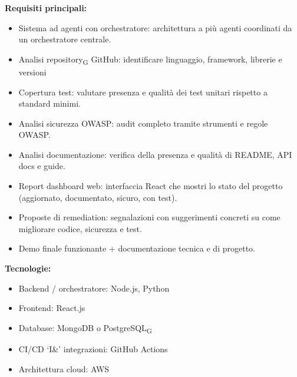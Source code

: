 \vspace{0.3cm}
\textbf{Requisiti principali:}
\begin{itemize}
	\item {Sistema ad agenti con orchestratore: architettura a più agenti coordinati da un orchestratore centrale.}
	\item {Analisi repository\textsubscript{G} GitHub: identificare linguaggio, framework, librerie e versioni}
    \item {Copertura test: valutare presenza e qualità dei test unitari rispetto a standard minimi.}
    \item {Analisi sicurezza OWASP: audit completo tramite strumenti e regole OWASP.}
    \item {Analisi documentazione: verifica della presenza e qualità di README, API docs e guide.}
    \item {Report dashboard web: interfaccia React che mostri lo stato del progetto (aggiornato, documentato, sicuro, con test).}
    \item {Proposte di remediation: segnalazioni con suggerimenti concreti su come migliorare codice, sicurezza e test.}
    \item {Demo finale funzionante + documentazione tecnica e di progetto.}
\end{itemize}

\vspace{0.3cm}
\textbf{Tecnologie:}
\begin{itemize}
	\item {Backend / orchestratore: Node.js, Python}
    \item {Frontend: React.js}
    \item {Database: MongoDB o PostgreSQL\textsubscript{G}}
    \item {CI/CD `I\&' integrazioni: GitHub Actions}
    \item {Architettura cloud: AWS}
\end{itemize}

